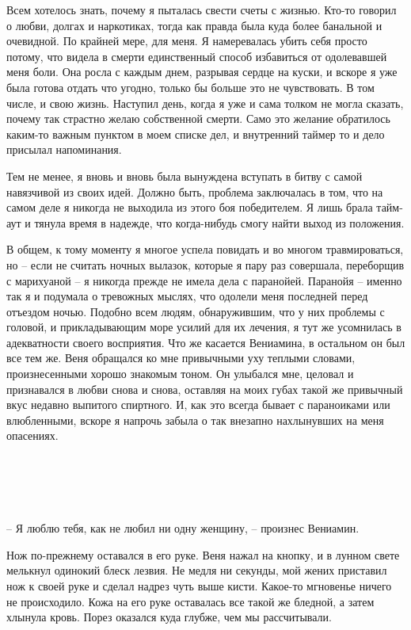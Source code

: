 \documentclass[
]{book}
\begin{document}
Всем хотелось знать, почему я пыталась свести счеты с жизнью. Кто-то говорил о любви, долгах и наркотиках, тогда как правда была куда более банальной и очевидной. По крайней мере, для меня. Я намеревалась убить себя просто потому, что видела в смерти единственный способ избавиться от одолевавшей меня боли. Она росла с каждым днем, разрывая сердце на куски, и вскоре я уже была готова отдать что угодно, только бы больше это не чувствовать. В том числе, и свою жизнь. Наступил день, когда я уже и сама толком не могла сказать, почему так страстно желаю собственной смерти. Само это желание обратилось каким-то важным пунктом в моем списке дел, и внутренний таймер то и дело присылал напоминания.

Тем не менее, я вновь и вновь была вынуждена вступать в битву с самой навязчивой из своих идей. Должно быть, проблема заключалась в том, что на самом деле я никогда не выходила из этого боя победителем. Я лишь брала тайм-аут и тянула время в надежде, что когда-нибудь смогу найти выход из положения.

В общем, к тому моменту я многое успела повидать и во многом травмироваться, но -- если не считать ночных вылазок, которые я пару раз совершала, переборщив с марихуаной -- я никогда прежде не имела дела с паранойей. Паранойя -- именно так я и подумала о тревожных мыслях, что одолели меня последней перед отъездом ночью. Подобно всем людям, обнаружившим, что у них проблемы с головой, и прикладывающим море усилий для их лечения, я тут же усомнилась в адекватности своего восприятия. Что же касается Вениамина, в остальном он был все тем же. Веня обращался ко мне привычными уху теплыми словами, произнесенными хорошо знакомым тоном. Он улыбался мне, целовал и признавался в любви снова и снова, оставляя на моих губах такой же привычный вкус недавно выпитого спиртного. И, как это всегда бывает с параноиками или влюбленными, вскоре я напрочь забыла о так внезапно нахлынувших на меня опасениях.

\hypertarget{chapter-38}{%
\chapter{~}\label{chapter-38}}

-- Я люблю тебя, как не любил ни одну женщину, -- произнес Вениамин.

Нож по-прежнему оставался в его руке. Веня нажал на кнопку, и в лунном свете мелькнул одинокий блеск лезвия. Не медля ни секунды, мой жених приставил нож к своей руке и сделал надрез чуть выше кисти. Какое-то мгновенье ничего не происходило. Кожа на его руке оставалась все такой же бледной, а затем хлынула кровь. Порез оказался куда глубже, чем мы рассчитывали.
\end{document}
